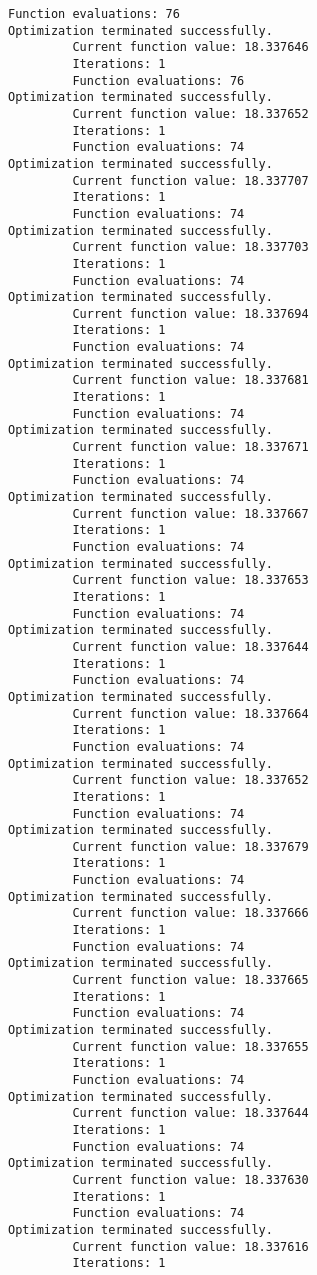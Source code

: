 \documentclass[11pt]{article}
\begin{document}
\begin{Verbatim}[commandchars=\\\{\}]
         Function evaluations: 76
Optimization terminated successfully.
         Current function value: 18.337646
         Iterations: 1
         Function evaluations: 76
Optimization terminated successfully.
         Current function value: 18.337652
         Iterations: 1
         Function evaluations: 74
Optimization terminated successfully.
         Current function value: 18.337707
         Iterations: 1
         Function evaluations: 74
Optimization terminated successfully.
         Current function value: 18.337703
         Iterations: 1
         Function evaluations: 74
Optimization terminated successfully.
         Current function value: 18.337694
         Iterations: 1
         Function evaluations: 74
Optimization terminated successfully.
         Current function value: 18.337681
         Iterations: 1
         Function evaluations: 74
Optimization terminated successfully.
         Current function value: 18.337671
         Iterations: 1
         Function evaluations: 74
Optimization terminated successfully.
         Current function value: 18.337667
         Iterations: 1
         Function evaluations: 74
Optimization terminated successfully.
         Current function value: 18.337653
         Iterations: 1
         Function evaluations: 74
Optimization terminated successfully.
         Current function value: 18.337644
         Iterations: 1
         Function evaluations: 74
Optimization terminated successfully.
         Current function value: 18.337664
         Iterations: 1
         Function evaluations: 74
Optimization terminated successfully.
         Current function value: 18.337652
         Iterations: 1
         Function evaluations: 74
Optimization terminated successfully.
         Current function value: 18.337679
         Iterations: 1
         Function evaluations: 74
Optimization terminated successfully.
         Current function value: 18.337666
         Iterations: 1
         Function evaluations: 74
Optimization terminated successfully.
         Current function value: 18.337665
         Iterations: 1
         Function evaluations: 74
Optimization terminated successfully.
         Current function value: 18.337655
         Iterations: 1
         Function evaluations: 74
Optimization terminated successfully.
         Current function value: 18.337644
         Iterations: 1
         Function evaluations: 74
Optimization terminated successfully.
         Current function value: 18.337630
         Iterations: 1
         Function evaluations: 74
Optimization terminated successfully.
         Current function value: 18.337616
         Iterations: 1

\end{Verbatim}
\end{document}
